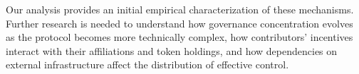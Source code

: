 \documentclass[No]{AEA}
\begin{document}
Our analysis provides an initial empirical characterization of these mechanisms. Further research is needed to understand how governance concentration evolves as the protocol becomes more technically complex, how contributors' incentives interact with their affiliations and token holdings, and how dependencies on external infrastructure affect the distribution of effective control.

\newpage


\end{document}
